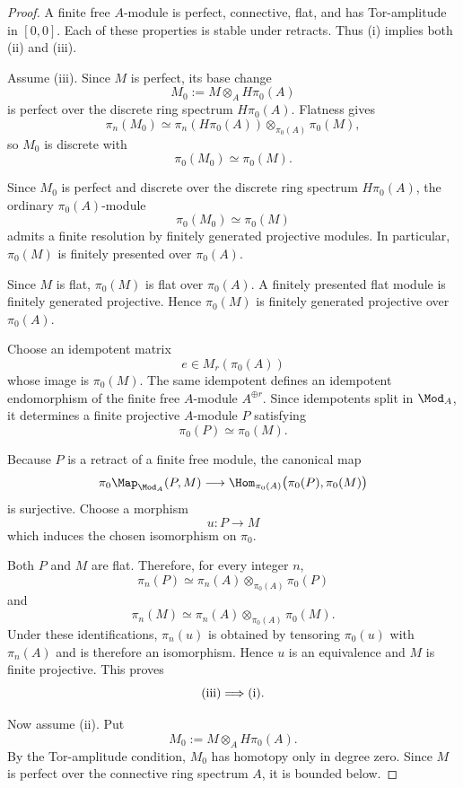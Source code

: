 \begin{proof}
A finite free \(A\)-module is perfect, connective, flat, and has
Tor-amplitude in \([0,0]\). Each of these properties is stable under
retracts. Thus \textup{(i)} implies both \textup{(ii)} and
\textup{(iii)}.

Assume \textup{(iii)}. Since \(M\) is perfect, its base change
\[
    M_0
    :=
    M\otimes_AH\pi_0(A)
\]
is perfect over the discrete ring spectrum \(H\pi_0(A)\). Flatness gives
\[
    \pi_n(M_0)
    \simeq
    \pi_n(H\pi_0(A))
    \otimes_{\pi_0(A)}
    \pi_0(M),
\]
so \(M_0\) is discrete with
\[
    \pi_0(M_0)
    \simeq
    \pi_0(M).
\]

Since \(M_0\) is perfect and discrete over the discrete ring spectrum
\(H\pi_0(A)\), the ordinary \(\pi_0(A)\)-module
\[
    \pi_0(M_0)
    \simeq
    \pi_0(M)
\]
admits a finite resolution by finitely generated projective modules. In
particular, \(\pi_0(M)\) is finitely presented over \(\pi_0(A)\).

Since \(M\) is flat, \(\pi_0(M)\) is flat over \(\pi_0(A)\). A finitely
presented flat module is finitely generated projective. Hence
\(\pi_0(M)\) is finitely generated projective over \(\pi_0(A)\).

Choose an idempotent matrix
\[
    e
    \in
    M_r(\pi_0(A))
\]
whose image is \(\pi_0(M)\). The same idempotent defines an idempotent
endomorphism of the finite free \(A\)-module \(A^{\oplus r}\). Since
idempotents split in \(\Mod_A\), it determines a finite projective
\(A\)-module \(P\) satisfying
\[
    \pi_0(P)
    \simeq
    \pi_0(M).
\]

Because \(P\) is a retract of a finite free module, the canonical map
\[
    \pi_0
    \Map_{\Mod_A}(P,M)
    \longrightarrow
    \Hom_{\pi_0(A)}
    \bigl(
        \pi_0(P),
        \pi_0(M)
    \bigr)
\]
is surjective. Choose a morphism
\[
    u
    \colon
    P
    \longrightarrow
    M
\]
which induces the chosen isomorphism on \(\pi_0\).

Both \(P\) and \(M\) are flat. Therefore, for every integer \(n\),
\[
    \pi_n(P)
    \simeq
    \pi_n(A)
    \otimes_{\pi_0(A)}
    \pi_0(P)
\]
and
\[
    \pi_n(M)
    \simeq
    \pi_n(A)
    \otimes_{\pi_0(A)}
    \pi_0(M).
\]
Under these identifications, \(\pi_n(u)\) is obtained by tensoring
\(\pi_0(u)\) with \(\pi_n(A)\) and is therefore an isomorphism. Hence
\(u\) is an equivalence and \(M\) is finite projective. This proves
\[
    \textup{(iii)}
    \Longrightarrow
    \textup{(i)}.
\]

Now assume \textup{(ii)}. Put
\[
    M_0
    :=
    M\otimes_AH\pi_0(A).
\]
By the Tor-amplitude condition, \(M_0\) has homotopy only in degree zero.
Since \(M\) is perfect over the connective ring spectrum \(A\), it is
bounded below.


\end{proof}
